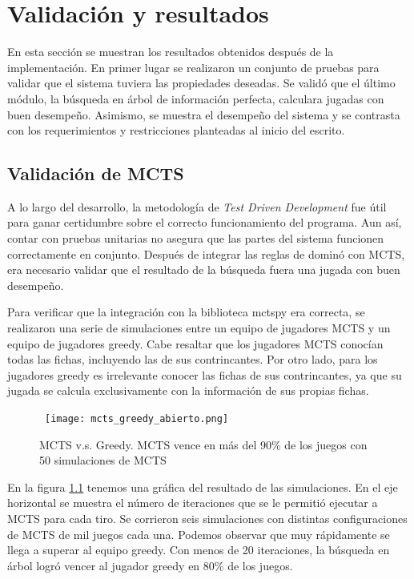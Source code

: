 \chapter{Validación y resultados}

\noindent
En esta sección se muestran los resultados obtenidos después de la
implementación. En primer lugar se realizaron un conjunto de pruebas para
validar que el sistema tuviera las propiedades deseadas. Se validó que el último
módulo, la búsqueda en árbol de información perfecta, calculara jugadas con buen
desempeño. Asimismo, se muestra el desempeño del sistema y se contrasta con los
requerimientos y restricciones planteadas al inicio del escrito.

\section{Validación de MCTS}

A lo largo del desarrollo, la metodología de  \textit{Test Driven Development}
fue útil para ganar certidumbre sobre el correcto funcionamiento del programa.
Aun así, contar con pruebas unitarias no asegura que las partes del sistema
funcionen correctamente en conjunto. Después de integrar las reglas de dominó
con MCTS, era necesario validar que el resultado de la búsqueda fuera una jugada
con buen desempeño.

Para verificar que la integración con la biblioteca mctspy era correcta, se
realizaron una serie de simulaciones entre un equipo de jugadores MCTS y un
equipo de jugadores greedy. Cabe resaltar que los jugadores MCTS conocían todas
las fichas, incluyendo las de sus contrincantes. Por otro lado, para los
jugadores greedy es irrelevante conocer las fichas de sus contrincantes, ya que
su jugada se calcula exclusivamente con la información de sus propias fichas.

\begin{figure}[ht]
    \begin{center}
        \hbox{\hspace{-1em} \texttt{[image: mcts\_greedy\_abierto.png]}}
        \caption{MCTS v.s. Greedy. MCTS vence en más del 90\% de los juegos con 50 simulaciones de MCTS}
        \label{MGA}
    \end{center}
\end{figure}

En la figura \ref{MGA} tenemos una gráfica del resultado de las simulaciones. En
el eje horizontal se muestra el número de iteraciones que se le permitió
ejecutar a MCTS para cada tiro. Se corrieron seis simulaciones con distintas
configuraciones de MCTS de mil juegos cada una. Podemos observar que muy
rápidamente se llega a superar al equipo greedy. Con menos de 20 iteraciones, la
búsqueda en árbol logró vencer al jugador greedy en 80\% de los juegos.

